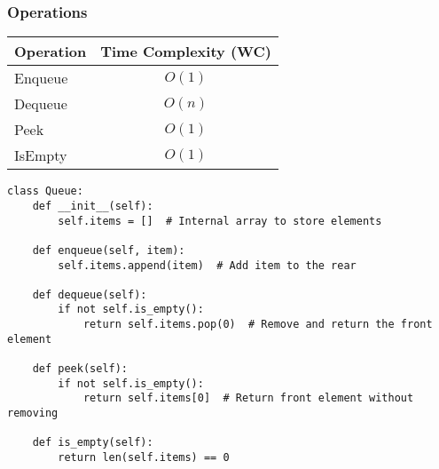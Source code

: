 \subsubsection{Operations}
\begin{summary}
    \begin{center}
        \begin{tabular}{lc}
            \toprule
            \textbf{Operation} & \textbf{Time Complexity (WC)} \\
            \midrule
            Enqueue  & $O(1)$ \\
            Dequeue  & $O(n)$ \\
            Peek     & $O(1)$ \\
            IsEmpty  & $O(1)$ \\
            \bottomrule
        \end{tabular}
    \end{center}
\end{summary}

\begin{algo}
\begin{lstlisting}
class Queue:
    def __init__(self):
        self.items = []  # Internal array to store elements

    def enqueue(self, item):
        self.items.append(item)  # Add item to the rear

    def dequeue(self):
        if not self.is_empty():
            return self.items.pop(0)  # Remove and return the front element

    def peek(self):
        if not self.is_empty():
            return self.items[0]  # Return front element without removing

    def is_empty(self):
        return len(self.items) == 0
\end{lstlisting}
\end{algo}